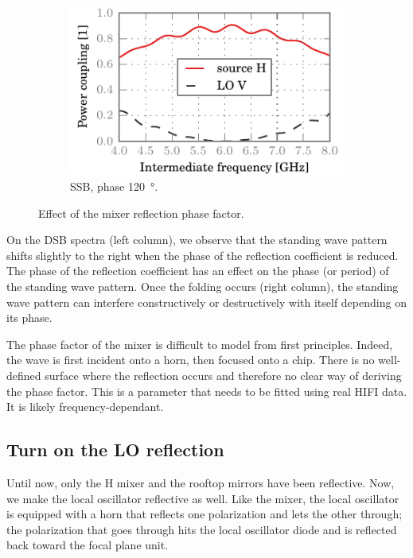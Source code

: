 \begin{figure}[hbtp]
\begin{subfigure}[b]{.5\textwidth}
        \includegraphics{chapter_3/11_phase_b_h_ssb}%
        \caption{SSB, phase \SI{120}{\degree}.}
    \end{subfigure}%
    \caption{Effect of the mixer reflection phase factor.}
    \label{fig:mixer_phase_factor}
\end{figure}

On the DSB spectra (left column), we observe that the standing wave pattern shifts slightly to the right when the phase of the reflection coefficient is reduced.
The phase of the reflection coefficient has an effect on the phase (or period) of the standing wave pattern.
Once the folding occurs (right column), the standing wave pattern can interfere constructively or destructively with itself depending on its phase.

The phase factor of the mixer is difficult to model from first principles.
Indeed, the wave is first incident onto a horn, then focused onto a chip.
There is no well-defined surface where the reflection occurs and therefore no clear way of deriving the phase factor.
This is a parameter that needs to be fitted using real HIFI data.
It is likely frequency-dependant.

\clearpage
\subsection{Turn on the LO reflection}
Until now, only the H mixer and the rooftop mirrors have been reflective.
Now, we make the local oscillator reflective as well.
Like the mixer, the local oscillator is equipped with a horn that reflects one polarization and lets the other through;
the polarization that goes through hits the local oscillator diode and is reflected back toward the focal plane unit.

